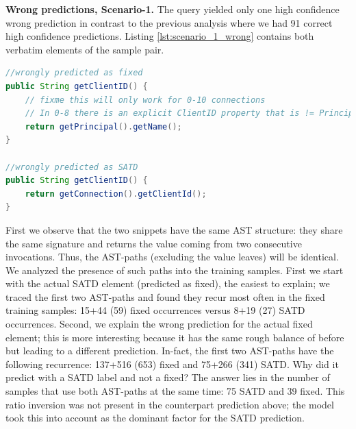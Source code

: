 \textbf{Wrong predictions, Scenario-1.}
The query yielded only one %
high confidence wrong prediction in contrast to the previous analysis where we had 91 correct high confidence predictions. Listing \ref{lst:scenario_1_wrong} contains both verbatim elements of the sample pair.


\begin{lstlisting}[caption={Scenario-1 wrong predictions, verbatim source code}, label={lst:scenario_1_wrong},language=Java]
//wrongly predicted as fixed
public String getClientID() {
    // fixme this will only work for 0-10 connections
    // In 0-8 there is an explicit ClientID property that is != Principal.
    return getPrincipal().getName();
}

//wrongly predicted as SATD
public String getClientID() {
    return getConnection().getClientId();
}
\end{lstlisting}

First we observe that the two snippets have the same AST structure: they share the same signature and returns the value coming from two consecutive invocations. Thus, the AST-paths (excluding the value leaves) will be identical. 
We analyzed the presence of such paths into the training samples. 
First we start with the actual SATD element (predicted as fixed), the easiest to explain; we traced the first two AST-paths and found they recur most often in the fixed training samples: 15+44 (59) fixed occurrences versus 8+19 (27) SATD occurrences. 
Second, we explain the wrong prediction for the actual fixed element; this is more interesting because it has the same rough balance of before but leading to a different prediction. In-fact, the first two AST-paths have the following recurrence: 137+516 (653) fixed and 75+266 (341) SATD. Why did it predict with a SATD label and not a fixed? The answer lies in the number of samples that use both AST-paths at the same time: 75 SATD and 39 fixed. This ratio inversion was not present in the counterpart prediction above; the model took this into account as the dominant factor for the SATD prediction. 
%
%
%

